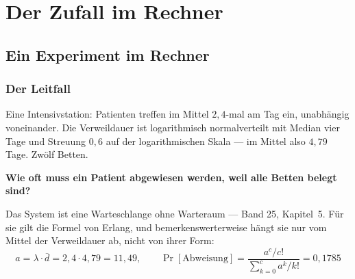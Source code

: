\part{Der Zufall im Rechner}

\chapter{Ein Experiment im Rechner}

\section{Der Leitfall}

\begin{merksatz}
Eine Intensivstation: Patienten treffen im Mittel $2{,}4$-mal am Tag ein, unabhängig voneinander. Die Verweildauer ist logarithmisch normalverteilt mit Median vier Tage und Streuung $0{,}6$ auf der logarithmischen Skala --- im Mittel also $4{,}79$ Tage. Zwölf Betten.

\begin{center}
\begin{minipage}{0.9\textwidth}
\textbf{Wie oft muss ein Patient abgewiesen werden, weil alle Betten belegt sind?}
\end{minipage}
\end{center}

Das System ist eine Warteschlange ohne Warteraum --- Band 25, Kapitel~5. Für sie gilt die Formel von Erlang, und bemerkenswerterweise hängt sie nur vom Mittel der Verweildauer ab, nicht von ihrer Form:
\[ a = \lambda\cdot\bar d = 2{,}4\cdot4{,}79 = 11{,}49, \qquad \Pr[\text{Abweisung}] = \frac{a^{c}/c!}{\sum_{k=0}^{c} a^{k}/k!} = 0{,}1785 \]

\begin{center}
\begin{minipage}{0.88\textwidth}
\end{minipage}
\end{center}
\end{merksatz}

